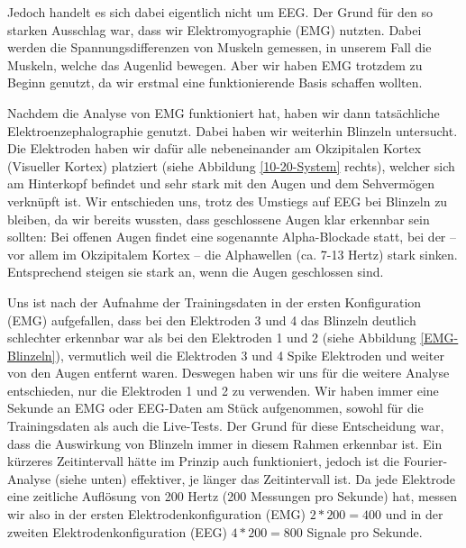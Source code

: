 \documentclass[11pt]{scrartcl}
\begin{document}
	Jedoch handelt es sich dabei eigentlich nicht um EEG. Der Grund für den so starken Ausschlag war, dass wir Elektromyographie (EMG) nutzten. Dabei werden die Spannungsdifferenzen von Muskeln gemessen, in unserem Fall die Muskeln, welche das Augenlid bewegen. \cite{wiki:EMG}
	Aber wir haben EMG trotzdem zu Beginn genutzt, da wir erstmal eine funktionierende Basis schaffen wollten.

	Nachdem die Analyse von EMG funktioniert hat, haben wir dann tatsächliche Elektroenzephalographie genutzt. Dabei haben wir weiterhin Blinzeln untersucht. Die Elektroden haben wir dafür alle nebeneinander am Okzipitalen Kortex (Visueller Kortex) platziert (siehe Abbildung \ref{10-20-System} rechts), welcher sich am Hinterkopf befindet und sehr stark mit den Augen und dem Sehvermögen verknüpft ist. \cite{Birbaumer2010} 
	Wir entschieden uns, trotz des Umstiegs auf EEG bei Blinzeln zu bleiben, da wir bereits wussten, dass geschlossene Augen klar erkennbar sein sollten: Bei offenen Augen findet eine sogenannte Alpha-Blockade statt, bei der -- vor allem im Okzipitalem Kortex -- die Alphawellen (ca. 7-13 Hertz) stark sinken. Entsprechend steigen sie stark an, wenn die Augen geschlossen sind. \cite{Springer:Berger} \cite{Praktikum} \cite{wiki:Berger-Effekt}


	Uns ist nach der Aufnahme der Trainingsdaten in der ersten Konfiguration (EMG) aufgefallen, dass bei den Elektroden 3 und 4 das Blinzeln deutlich schlechter erkennbar war als bei den Elektroden 1 und 2 (siehe Abbildung \ref{EMG-Blinzeln}), vermutlich weil die Elektroden 3 und 4 Spike Elektroden und weiter von den Augen entfernt waren.
	Deswegen haben wir uns für die weitere Analyse entschieden, nur die Elektroden 1 und 2 zu verwenden.
	Wir haben immer eine Sekunde an EMG oder EEG-Daten am Stück aufgenommen, sowohl für die Trainingsdaten als auch die Live-Tests. Der Grund für diese Entscheidung war, dass die Auswirkung von Blinzeln immer in diesem Rahmen erkennbar ist. Ein kürzeres Zeitintervall hätte im Prinzip auch funktioniert,
jedoch ist die Fourier-Analyse (siehe unten) effektiver, je länger das Zeitintervall ist.
	Da jede Elektrode eine zeitliche Auflösung von 200 Hertz (200 Messungen pro Sekunde) hat, messen wir also in der ersten Elektrodenkonfiguration (EMG) $2 * 200 = 400$ und in der zweiten Elektrodenkonfiguration (EEG) $4 * 200 = 800$ Signale pro Sekunde.
\end{document}
